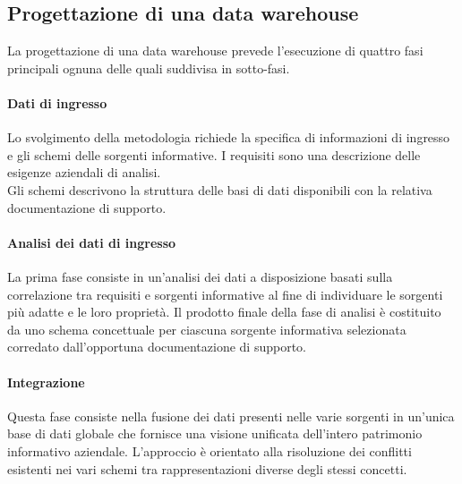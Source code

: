 \subsection{Progettazione di una data warehouse}
La progettazione di una data warehouse prevede l'esecuzione di quattro fasi principali ognuna delle quali suddivisa in sotto-fasi.
\paragraph{Dati di ingresso} Lo svolgimento della metodologia richiede la specifica di informazioni di ingresso e gli schemi delle sorgenti informative. I requisiti sono una descrizione delle esigenze aziendali di analisi.\\
Gli schemi descrivono la struttura delle basi di dati disponibili con la relativa documentazione di supporto.
\paragraph{Analisi dei dati di ingresso} La prima fase consiste in un'analisi dei dati a disposizione basati sulla correlazione tra requisiti e sorgenti informative al fine di individuare le sorgenti più adatte e le loro proprietà.
Il prodotto finale della fase di analisi è costituito da uno schema concettuale per ciascuna sorgente informativa selezionata corredato dall'opportuna documentazione di supporto.
\paragraph{Integrazione} Questa fase consiste nella fusione dei dati presenti nelle varie sorgenti in un'unica base di dati globale che fornisce una visione unificata dell'intero patrimonio informativo aziendale. L'approccio è orientato alla risoluzione dei conflitti esistenti nei vari schemi tra rappresentazioni diverse degli stessi concetti.
